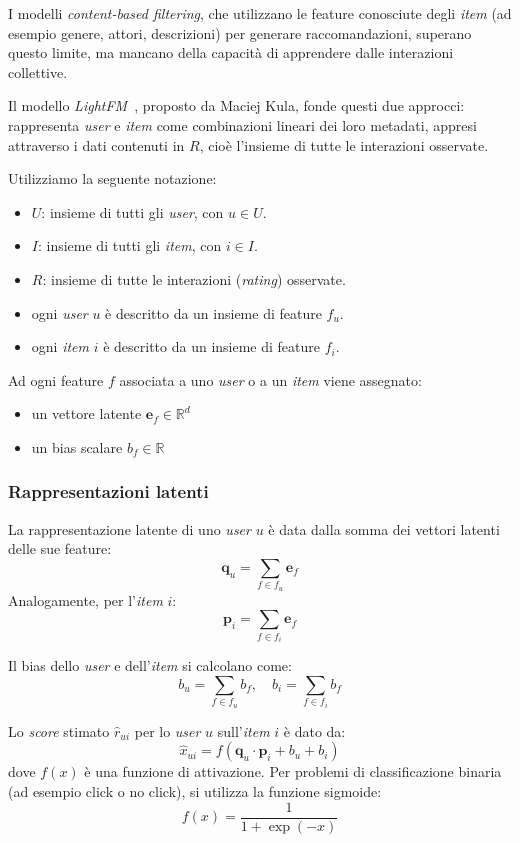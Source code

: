 I modelli \textit{content-based filtering}, che utilizzano le feature conosciute degli \textit{item} (ad esempio genere, attori, descrizioni) per generare raccomandazioni, superano questo limite, ma mancano della capacità di apprendere dalle interazioni collettive.

Il modello \textit{LightFM}~\cite{LightFM}, proposto da Maciej Kula, fonde questi due approcci: rappresenta \textit{user} e \textit{item} come combinazioni lineari dei loro metadati, appresi attraverso i dati contenuti in $R$, cioè l'insieme di tutte le interazioni osservate.

Utilizziamo la seguente notazione:
\begin{itemize}
    \item $U$: insieme di tutti gli \textit{user}, con $u \in U$.
    \item $I$: insieme di tutti gli \textit{item}, con $i \in I$.
    \item $R$: insieme di tutte le interazioni (\textit{rating}) osservate.
    \item ogni \textit{user} $u$ è descritto da un insieme di feature $f_u$.
    \item ogni \textit{item} $i$ è descritto da un insieme di feature $f_i$.
\end{itemize}

Ad ogni feature $f$ associata a uno \textit{user} o a un \textit{item} viene assegnato:
\begin{itemize}
    \item un vettore latente $\mathbf{e}_f \in \mathbb{R}^d$
    \item un bias scalare $b_f \in \mathbb{R}$
\end{itemize}

\subsubsection{Rappresentazioni latenti}
La rappresentazione latente di uno \textit{user} $u$ è data dalla somma dei vettori latenti delle sue feature:
\[
\mathbf{q}_u = \sum_{f \in f_u} \mathbf{e}_f
\]
Analogamente, per l'\textit{item} $i$:
\[
\mathbf{p}_i = \sum_{f \in f_i} \mathbf{e}_f
\]

Il bias dello \textit{user} e dell'\textit{item} si calcolano come:
\[
b_u = \sum_{f \in f_u} b_f, \quad b_i = \sum_{f \in f_i} b_f
\]

Lo \textit{score} stimato $\hat{r}_{ui}$ per lo \textit{user} $u$ sull'\textit{item} $i$ è dato da:
\[
\hat{x}_{ui} = f\left( \mathbf{q}_u \cdot \mathbf{p}_i + b_u + b_i \right)
\]
dove $f(x)$ è una funzione di attivazione. Per problemi di classificazione binaria (ad esempio click o no click), si utilizza la funzione sigmoide:
\[
f(x) = \frac{1}{1 + \exp(-x)}
\]


